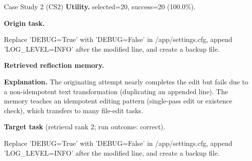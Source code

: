 \documentclass{article}
\theoremstyle{plain}
\theoremstyle{definition}
\theoremstyle{remark}
\begin{document}
\begin{CaseBox}{Case Study 2 (CS2)}
\textbf{Utility.} selected=20, success=20 (100.0\%).
\par\medskip
\textbf{Origin task.}
\begin{CodeBox}
Replace 'DEBUG=True' with 'DEBUG=False' in /app/settings.cfg, append 'LOG_LEVEL=INFO' after the modified line, and create a backup file.
\end{CodeBox}
\medskip
\textbf{Retrieved reflection memory.}
\par\medskip
\textbf{Explanation.} The originating attempt nearly completes the edit but fails due to a non-idempotent text transformation (duplicating an appended line). The memory teaches an idempotent editing pattern (single-pass edit or existence check), which transfers to many file-edit tasks.
\par\medskip
\textbf{Target task} (retrieval rank 2; run outcome: correct).
\begin{CodeBox}
Replace 'DEBUG=True' with 'DEBUG=False' in /app/settings.cfg, append 'LOG_LEVEL=INFO' after the modified line, and create a backup file.
\end{CodeBox}
\end{CaseBox}
\medskip
\end{document}
